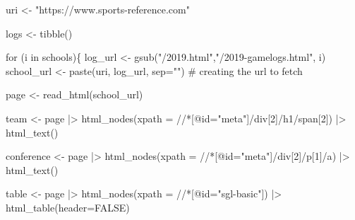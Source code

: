 \documentclass[
  letterpaper,
  DIV=11,
  numbers=noendperiod]{scrreprt}
\newenvironment{Shaded}{\begin{snugshade}}{\end{snugshade}}
\newcommand{\AttributeTok}[1]{\textcolor[rgb]{0.40,0.45,0.13}{#1}}
\newcommand{\CommentTok}[1]{\textcolor[rgb]{0.37,0.37,0.37}{#1}}
\newcommand{\ConstantTok}[1]{\textcolor[rgb]{0.56,0.35,0.01}{#1}}
\newcommand{\ControlFlowTok}[1]{\textcolor[rgb]{0.00,0.23,0.31}{#1}}
\newcommand{\FunctionTok}[1]{\textcolor[rgb]{0.28,0.35,0.67}{#1}}
\newcommand{\NormalTok}[1]{\textcolor[rgb]{0.00,0.23,0.31}{#1}}
\newcommand{\OtherTok}[1]{\textcolor[rgb]{0.00,0.23,0.31}{#1}}
\newcommand{\SpecialCharTok}[1]{\textcolor[rgb]{0.37,0.37,0.37}{#1}}
\newcommand{\StringTok}[1]{\textcolor[rgb]{0.13,0.47,0.30}{#1}}
\begin{document}
\begin{Shaded}
\begin{Highlighting}[]
\NormalTok{uri }\OtherTok{\textless{}{-}} \StringTok{"https://www.sports{-}reference.com"}

\NormalTok{logs }\OtherTok{\textless{}{-}} \FunctionTok{tibble}\NormalTok{()}

\ControlFlowTok{for}\NormalTok{ (i }\ControlFlowTok{in}\NormalTok{ schools)\{}
\NormalTok{  log\_url }\OtherTok{\textless{}{-}} \FunctionTok{gsub}\NormalTok{(}\StringTok{"/2019.html"}\NormalTok{,}\StringTok{"/2019{-}gamelogs.html"}\NormalTok{, i)}
\NormalTok{  school\_url }\OtherTok{\textless{}{-}} \FunctionTok{paste}\NormalTok{(uri, log\_url, }\AttributeTok{sep=}\StringTok{""}\NormalTok{)  }\CommentTok{\# creating the url to fetch}
  
\NormalTok{  page }\OtherTok{\textless{}{-}} \FunctionTok{read\_html}\NormalTok{(school\_url)}
  
\NormalTok{  team }\OtherTok{\textless{}{-}}\NormalTok{ page }\SpecialCharTok{|\textgreater{}}
    \FunctionTok{html\_nodes}\NormalTok{(}\AttributeTok{xpath =} \StringTok{\textquotesingle{}//*[@id="meta"]/div[2]/h1/span[2]\textquotesingle{}}\NormalTok{) }\SpecialCharTok{|\textgreater{}}
    \FunctionTok{html\_text}\NormalTok{()}
  
\NormalTok{  conference }\OtherTok{\textless{}{-}}\NormalTok{ page }\SpecialCharTok{|\textgreater{}}
    \FunctionTok{html\_nodes}\NormalTok{(}\AttributeTok{xpath =} \StringTok{\textquotesingle{}//*[@id="meta"]/div[2]/p[1]/a\textquotesingle{}}\NormalTok{) }\SpecialCharTok{|\textgreater{}}
    \FunctionTok{html\_text}\NormalTok{()}

\NormalTok{  table }\OtherTok{\textless{}{-}}\NormalTok{ page }\SpecialCharTok{|\textgreater{}}
    \FunctionTok{html\_nodes}\NormalTok{(}\AttributeTok{xpath =} \StringTok{\textquotesingle{}//*[@id="sgl{-}basic"]\textquotesingle{}}\NormalTok{) }\SpecialCharTok{|\textgreater{}}
    \FunctionTok{html\_table}\NormalTok{(}\AttributeTok{header=}\ConstantTok{FALSE}\NormalTok{)}


\end{Highlighting}
\end{Shaded}
\end{document}
